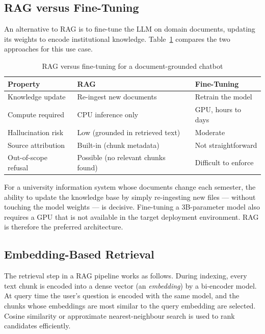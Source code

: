\subsection{RAG versus Fine-Tuning}

An alternative to RAG is to fine-tune the LLM on domain documents, updating its weights to encode institutional knowledge. Table~\ref{tab:rag-vs-ft} compares the two approaches for this use case.

\begin{table}[H]
\centering
\caption{RAG versus fine-tuning for a document-grounded chatbot}
\label{tab:rag-vs-ft}
\begin{tabular}{lll}
\hline
\textbf{Property} & \textbf{RAG} & \textbf{Fine-Tuning} \\
\hline
Knowledge update & Re-ingest new documents & Retrain the model \\
Compute required & CPU inference only & GPU, hours to days \\
Hallucination risk & Low (grounded in retrieved text) & Moderate \\
Source attribution & Built-in (chunk metadata) & Not straightforward \\
Out-of-scope refusal & Possible (no relevant chunks found) & Difficult to enforce \\
\hline
\end{tabular}
\end{table}

For a university information system whose documents change each semester, the ability to update the knowledge base by simply re-ingesting new files — without touching the model weights — is decisive. Fine-tuning a 3B-parameter model also requires a GPU that is not available in the target deployment environment. RAG is therefore the preferred architecture.

\subsection{Embedding-Based Retrieval}

The retrieval step in a RAG pipeline works as follows. During indexing, every text chunk is encoded into a dense vector (an \emph{embedding}) by a bi-encoder model. At query time the user's question is encoded with the same model, and the chunks whose embeddings are most similar to the query embedding are selected. Cosine similarity or approximate nearest-neighbour search is used to rank candidates efficiently.

